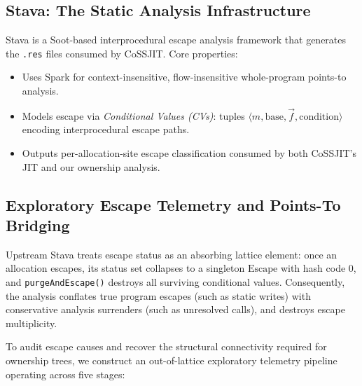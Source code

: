 \documentclass[12pt,a4paper]{article}
\begin{document}
\subsection{Stava: The Static Analysis Infrastructure}

Stava is a Soot-based interprocedural escape analysis framework that generates the \texttt{.res} files consumed by CoSSJIT. Core properties:

\begin{itemize}
  \item Uses Spark for context-insensitive, flow-insensitive whole-program points-to analysis.
  \item Models escape via \emph{Conditional Values (CVs)}: tuples $\langle m, \text{base}, \vec{f}, \text{condition} \rangle$ encoding interprocedural escape paths.
  \item Outputs per-allocation-site escape classification consumed by both CoSSJIT's JIT and our ownership analysis.
\end{itemize}

\subsection{Exploratory Escape Telemetry and Points-To Bridging}
\label{sec:escape-telemetry}

Upstream Stava treats escape status as an absorbing lattice element: once an allocation escapes, its status set collapses to a singleton $\text{Escape}$ with hash code 0, and \texttt{purgeAndEscape()} destroys all surviving conditional values. Consequently, the analysis conflates true program escapes (such as static writes) with conservative analysis surrenders (such as unresolved calls), and destroys escape multiplicity.

To audit escape causes and recover the structural connectivity required for ownership trees, we construct an out-of-lattice exploratory telemetry pipeline operating across five stages:
\end{document}
